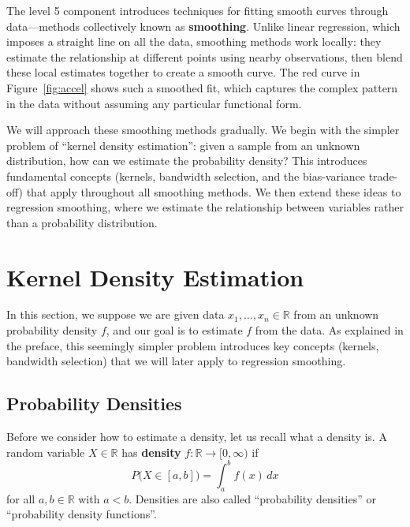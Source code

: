 \documentclass[
  a4paper,
]{article}
\theoremstyle{definition}
\theoremstyle{definition}
\theoremstyle{definition}
\theoremstyle{definition}
\theoremstyle{remark}
\begin{document}
The level 5 component introduces techniques for fitting smooth curves through
data---methods collectively known as \textbf{smoothing}. Unlike linear regression,
which imposes a straight line on all the data, smoothing methods work locally:
they estimate the relationship at different points using nearby observations,
then blend these local estimates together to create a smooth curve. The red
curve in Figure~\ref{fig:accel} shows such a smoothed fit, which captures the
complex pattern in the data without assuming any particular functional form.

We will approach these smoothing methods gradually. We begin with the simpler
problem of ``kernel density estimation'': given a sample from an unknown
distribution, how can we estimate the probability density? This introduces
fundamental concepts (kernels, bandwidth selection, and the bias-variance
trade-off) that apply throughout all smoothing methods. We then extend these
ideas to regression smoothing, where we estimate the relationship between
variables rather than a probability distribution.

\clearpage

\section{Kernel Density Estimation}\label{X01-KDE}

In this section, we suppose we are given data \(x_1,\ldots, x_n \in\mathbb{R}\) from an
unknown probability density \(f\), and our goal is to estimate \(f\) from the data.
As explained in the preface, this seemingly simpler problem introduces key
concepts (kernels, bandwidth selection) that we will later apply to regression
smoothing.

\subsection{Probability Densities}\label{probability-densities}

Before we consider how to estimate a density, let us recall what a
density is. A random variable \(X \in \mathbb{R}\) has \textbf{density} \(f\colon
\mathbb{R}\to [0, \infty)\) if
\begin{equation*}
  P\bigl(X \in [a,b]\bigr)
  = \int_a^b f(x) \,dx
\end{equation*}
for all \(a, b\in\mathbb{R}\) with \(a < b\). Densities are also called
``probability densities'' or ``probability density functions''.
\end{document}
